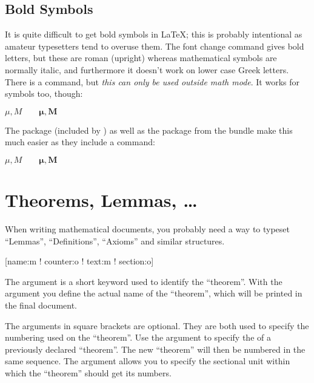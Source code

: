 

\subsection{Bold Symbols}%

It is quite difficult to get bold symbols in \LaTeX{}; this is
probably intentional as amateur typesetters tend to overuse them.  The
font change command  gives bold letters, but these are
roman (upright) whereas mathematical symbols are normally italic, and
furthermore it doesn't work on lower case Greek letters.
There is a  command, but \emph{this can only be used
  outside math mode}. It works for symbols too, though:
\begin{example}
$\mu, M \qquad 
\mathbf{\mu}, \mathbf{M}$
\qquad {}
\end{example}

The package  (included by ) as well as the
package  from the  bundle make this much easier as they include
a  command:

\begin{example}
$\mu, M \qquad
\boldsymbol{\mu}, \boldsymbol{M}$
\end{example}


\section{Theorems, Lemmas, \ldots}

When writing mathematical documents, you probably need a way to
typeset ``Lemmas'', ``Definitions'', ``Axioms'' and similar
structures.
\begin{lscommand}
  [name:m ! counter:o ! text:m ! section:o]
\end{lscommand}
The  argument is a short keyword used to identify the
``theorem''. With the  argument you define the actual name
of the ``theorem'', which will be printed in the final document.

The arguments in square brackets are optional. They are both used to
specify the numbering used on the ``theorem''. Use  the 
argument to specify the  of a previously declared
``theorem''. The new ``theorem'' will then be numbered in the same
sequence.  The  argument allows you to specify the
sectional unit within which the ``theorem'' should get its numbers.

